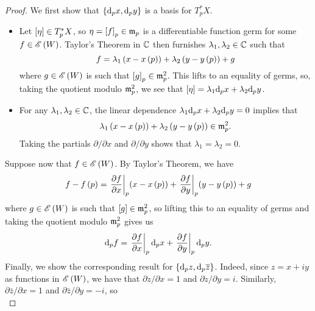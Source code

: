 \documentclass[../Moduli_Spaces_of_Riemann_Surfaces.tex]{subfiles}
\begin{document}
    \begin{proof}
        We first show that $\left\{\mathrm{d}_px,\mathrm{d}_py\right\}$ is a basis for $T_p^\ast X$.
        \begin{itemize}
            \item Let $\left[\eta\right]\in T_p^\ast X$, so $\eta=\left[f\right]_p\in\mathfrak{m}_p$ is a differentiable function germ for some $f\in\mathscr{E}\left(W\right)$. Taylor's Theorem in $\mathbb{C}$ then furnishes $\lambda_1,\lambda_2\in\mathbb{C}$ such that
                \begin{equation*}
                    f=\lambda_1\left(x-x\left(p\right)\right)+\lambda_2\left(y-y\left(p\right)\right)+g
                \end{equation*}
                where $g\in\mathscr{E}\left(W\right)$ is such that $\left[g\right]_p\in\mathfrak{m}^2_p$. This lifts to an equality of germs, so, taking the quotient modulo $\mathfrak{m}^2_p$, we see that $\left[\eta\right]=\lambda_1\mathrm{d}_px+\lambda_2\mathrm{d}_py$.
            \item For any $\lambda_1,\lambda_2\in\mathbb{C}$, the linear dependence $\lambda_1\mathrm{d}_px+\lambda_2\mathrm{d}_py=0$ implies that
                \begin{equation*}
                    \lambda_1\left(x-x\left(p\right)\right)+\lambda_2\left(y-y\left(p\right)\right)\in\mathfrak{m}^2_p.
                \end{equation*}
                Taking the partials $\partial/\partial x$ and $\partial/\partial y$ shows that $\lambda_1=\lambda_2=0$.
        \end{itemize}
        Suppose now that $f\in\mathscr{E}\left(W\right)$. By Taylor's Theorem, we have
        \begin{equation*}
            f-f\left(p\right)=\left.\frac{\partial f}{\partial x}\right|_p\!\left(x-x\left(p\right)\right)+\left.\frac{\partial f}{\partial y}\right|_p\!\left(y-y\left(p\right)\right)+g
        \end{equation*}
        where $g\in\mathscr{E}\left(W\right)$ is such that $\left[g\right]\in\mathfrak{m}^2_p$, so lifting this to an equality of germs and taking the quotient modulo $\mathfrak{m}^2_p$ gives us
        \begin{equation*}
            \mathrm{d}_pf=\left.\frac{\partial f}{\partial x}\right|_p\mathrm{d}_px+\left.\frac{\partial f}{\partial y}\right|_p\mathrm{d}_py.
        \end{equation*}
        Finally, we show the corresponding result for $\left\{\mathrm{d}_pz,\mathrm{d}_p\overline{z}\right\}$. Indeed, since $z=x+iy$ as functions in $\mathscr{E}\left(W\right)$, we have that $\partial z/\partial x=1$ and $\partial z/\partial y=i$. Similarly, $\partial\bar{z}/\partial x=1$ and $\partial\bar{z}/\partial y=-i$, so
        \begin{equation*}

\end{equation*}
\end{proof}
\end{document}
